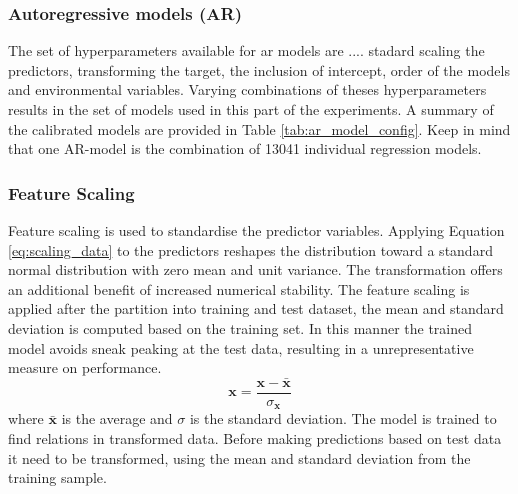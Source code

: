 \subsubsection{Autoregressive models (AR)}
The set of hyperparameters available for ar models are ....
stadard scaling the predictors, transforming the target, the inclusion of intercept, order of the models and environmental variables. Varying combinations of theses hyperparameters results in the set of models used in this part of the experiments. 
A summary of the calibrated models are provided in Table \ref{tab:ar_model_config}. Keep in mind that one AR-model is the combination of 13041 individual regression models.  


\subsubsection{Feature Scaling} \label{sec:scaling_predictors}
Feature scaling is used to standardise the predictor variables.
Applying Equation \ref{eq:scaling_data} to the predictors reshapes the distribution toward a standard normal distribution with zero mean and unit variance. 
The transformation offers an additional benefit of increased numerical stability. %
The feature scaling is applied after the partition into training and test dataset, the mean and standard deviation is computed based on the training set. In this manner the trained model avoids sneak peaking at the test data, resulting in a unrepresentative measure on performance.
\begin{equation} \label{eq:scaling_data}
    \mathbf{x} = \frac{\mathbf{x} - \bar{\mathbf{x}}}{\sigma_{\mathbf{x}}}
\end{equation}
where $\bar{\mathbf{x}}$ is the average and $\sigma$ is the standard deviation. The model is trained to find relations in transformed data. Before making predictions based on test data it need to be transformed, using the mean and standard deviation from the training sample.

